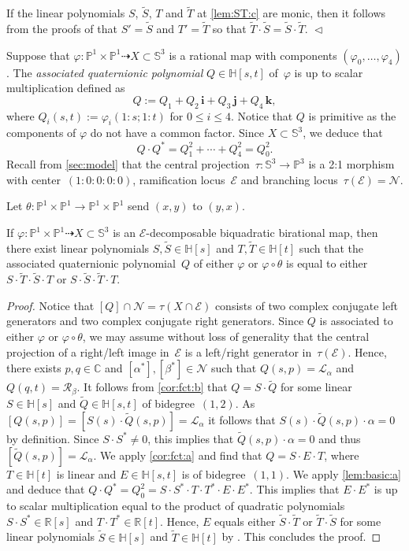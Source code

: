 \documentclass[11pt]{article}
\newcommand{\RL}[2]{\Cref{lem:#1}\ref{lem:#1:#2}}
\newcommand{\C}{\mathbb{C}}
\newcommand{\R}{\mathbb{R}}
\renewcommand{\H}{\mathbb{H}}
\renewcommand{\P}{\mathbb{P}}
\renewcommand{\S}{\mathbb{S}}
\newcommand{\cN}{\mathcal{N}}
\newcommand{\cE}{\mathcal{E}}
\newcommand{\cL}{\mathcal{L}}
\newcommand{\cR}{\mathcal{R}}
\newcommand{\tQ}{\tilde{Q}}
\newcommand{\tS}{\tilde{S}}
\newcommand{\tT}{\tilde{T}}
\newcommand{\qi}{\mathbf{i}}
\newcommand{\qj}{\mathbf{j}}
\newcommand{\qk}{\mathbf{k}}
\renewcommand{\c}{\colon}
\newcommand{\dto}{\dasharrow}
\newcommand{\df}{\emph}
\newcommand{\Wlog}{without loss of generality }
\newcommand{\st}{such that }
\newcommand{\END}{\hfill $\vartriangleleft$}
\begin{document}
\begin{remark}
If the linear polynomials $S$, $\tS$, $T$ and $\tT$ at \RL{ST}{c} are monic,
then it follows from the proofs of \citep[Theorems~7.3 and 7.6]{2022n1}
that $S'=\tS$ and $T'=\tT$ so that $\tT\cdot \tS=\tS\cdot\tT$.
\END
\end{remark}


Suppose that $\varphi\c \P^1\times\P^1\dto X\subset\S^3$ is a rational map with
components $(\varphi_0,\ldots,\varphi_4)$.
The \df{associated quaternionic polynomial} $Q\in\H[s,t]$ of~$\varphi$ is
up to scalar multiplication defined as
\[
Q:=Q_1+Q_2\,\qi+Q_3\,\qj+Q_4\,\qk,
\]
where $Q_i(s,t):=\varphi_i(1:s;1:t)$ for $0\leq i\leq 4$.
Notice that $Q$ is primitive as the components of $\varphi$ do not have a common factor.
Since $X\subset\S^3$, we deduce that
\[
Q\cdot Q^*=Q_1^2+\cdots+Q_4^2=Q_0^2.
\]
Recall from \textsection\ref{sec:model} that the central projection~$\tau\c \S^3\to \P^3$ is a 2:1 morphism with
center~$(1:0:0:0:0)$, ramification locus~$\cE$
and branching locus~$\tau(\cE)=\cN$.

Let $\theta\c\P^1\times\P^1\to\P^1\times\P^1$ send $(x,y)$ to $(y,x)$.

\begin{lemma}
\label{lem:Q}
If $\varphi\c\P^1\times\P^1\dto X\subset \S^3$ is an
$\cE$-decomposable biquadratic birational map,
then
there exist linear polynomials $S,\tS\in\H[s]$ and $T,\tT\in\H[t]$
such that the associated quaternionic polynomial~$Q$ of either $\varphi$ or $\varphi\circ\theta$
is equal to either
$S\cdot \tT\cdot \tS\cdot T$ or $S\cdot\tS\cdot \tT\cdot T$.
\end{lemma}

\begin{proof}
Notice that $[Q]\cap\cN=\tau(X\cap\cE)$ consists
of two complex conjugate left generators and
two complex conjugate right generators.
Since $Q$ is associated to either $\varphi$ or $\varphi\circ\theta$,
we may assume \Wlog that the central projection of a right/left image in~$\cE$
is a left/right generator in~$\tau(\cE)$.
Hence, there exists $p,q\in\C$ and $[\alpha^*],[\beta^*]\in\cN$ \st
$Q(s,p)=\cL_\alpha$ and $Q(q,t)=\cR_\beta$.
It follows from \ref{cor:fct:b} that
$Q=S\cdot\tQ$ for some linear $S\in\H[s]$ and $\tQ\in\H[s,t]$ of bidegree~$(1,2)$.
As $[Q(s,p)]=[S(s)\cdot \tQ(s,p)]=\cL_\alpha$ it follows that $S(s)\cdot \tQ(s,p)\cdot \alpha=0$ by definition.
Since $S\cdot S^*\neq 0$, this implies that $\tQ(s,p)\cdot \alpha=0$
and thus $[\tQ(s,p)]=\cL_\alpha$.
We apply \ref{cor:fct:a} and find that $Q=S\cdot E\cdot T$,
where $T\in \H[t]$ is linear and $E\in\H[s,t]$ is of bidegree~$(1,1)$.
We apply \RL{basic}{a} and deduce that
$
Q\cdot Q^*=Q_0^2=S\cdot S^*\cdot T\cdot T^*\cdot E\cdot E^*.
$
This implies that $E\cdot E^*$ is up to scalar multiplication equal to the product
of quadratic polynomials $S\cdot S^*\in\R[s]$ and $T\cdot T^*\in\R[t]$.
Hence,
$E$ equals either $\tS\cdot\tT$ or $\tT\cdot\tS$ for some linear polynomials $\tS\in\H[s]$ and $\tT\in\H[t]$
by .
This concludes the proof.
\end{proof}
\end{document}
